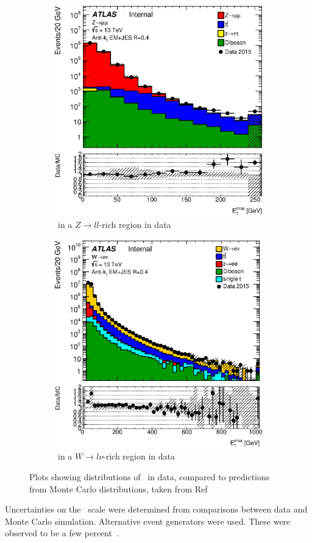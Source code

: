 \begin{figure}[!h]
\begin{subfigure}{0.5\textwidth}
   \includegraphics[width=\textwidth]{figures/zmumuStack_met.eps}
\caption{\met\ in a $Z\to ll$-rich region in data}
\label{fig:metPerfrunIIA}
\end{subfigure} %
\begin{subfigure}{0.5\textwidth}
   \includegraphics[width=\textwidth]{figures/wenuStack_met.eps}
\caption{\met\ in a $W\to l\nu$-rich region in data}
\label{fig:metPerfrunIIB}
\end{subfigure}
\caption{Plots showing distributions of \met\ in data, compared to predictions from Monte Carlo distributions, taken from 
Ref~\cite{Brunt:2149445}}
\end{figure}

\par Uncertainties on the \met\ scale were determined from comparisons between data and Monte Carlo
simulation. Alternative event generators were used. These were observed to be a few percent~\cite{Brunt:2149445}.
